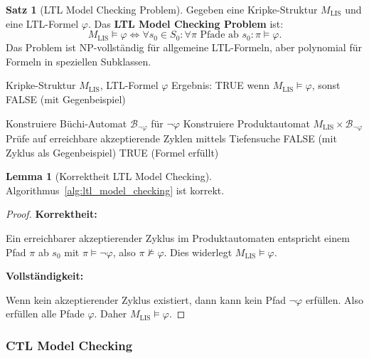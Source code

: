 \documentclass[a4paper,12pt]{article}
\theoremstyle{definition}
\newtheorem{satz}{Satz}
\newtheorem{lemma}{Lemma}
\begin{document}
\begin{satz}[LTL Model Checking Problem]
	\label{satz:ltl_model_checking}
	Gegeben eine Kripke-Struktur $M_{\text{LIS}}$ und eine LTL-Formel $\varphi$. Das \textbf{LTL Model Checking Problem} ist:
	\[
	M_{\text{LIS}} \models \varphi \iff \forall s_0 \in S_0: \forall \pi \text{ Pfade ab } s_0: \pi \models \varphi.
	\]
	Das Problem ist NP-vollständig für allgemeine LTL-Formeln, aber polynomial für Formeln in speziellen Subklassen.
\end{satz}

\begin{algorithm}[H]
	\caption{LTL Model Checking (Automatentheorie-Ansatz)}
	\label{alg:ltl_model_checking}
	\begin{algorithmic}[1]
		\Require Kripke-Struktur $M_{\text{LIS}}$, LTL-Formel $\varphi$
		\Ensure Ergebnis: TRUE wenn $M_{\text{LIS}} \models \varphi$, sonst FALSE (mit Gegenbeispiel)
		
		\State Konstruiere Büchi-Automat $\mathcal{B}_{\neg\varphi}$ für $\neg\varphi$
		\State Konstruiere Produktautomat $M_{\text{LIS}} \times \mathcal{B}_{\neg\varphi}$
		\State Prüfe auf erreichbare akzeptierende Zyklen mittels Tiefensuche
		\State \Return FALSE (mit Zyklus als Gegenbeispiel)
		\Else
		\State \Return TRUE (Formel erfüllt)
		\EndIf
	\end{algorithmic}
\end{algorithm}

\begin{lemma}[Korrektheit LTL Model Checking]
	\label{lem:ltl_mc_korrektheit}
	Algorithmus~\ref{alg:ltl_model_checking} ist korrekt.
\end{lemma}

\begin{proof}
	\textbf{Korrektheit:}
	
	Ein erreichbarer akzeptierender Zyklus im Produktautomaten entspricht einem Pfad $\pi$ ab $s_0$ mit $\pi \models \neg\varphi$, also $\pi \not\models \varphi$. Dies widerlegt $M_{\text{LIS}} \models \varphi$.
	
	\textbf{Vollständigkeit:}
	
	Wenn kein akzeptierender Zyklus existiert, dann kann kein Pfad $\neg\varphi$ erfüllen. Also erfüllen alle Pfade $\varphi$. Daher $M_{\text{LIS}} \models \varphi$.
\end{proof}

\subsubsection{CTL Model Checking}
\end{document}
